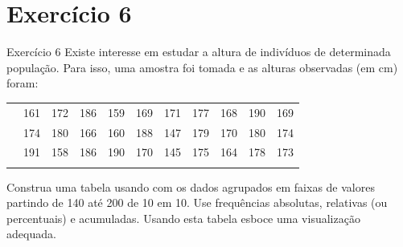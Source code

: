 \documentclass[
  ignorenonframetext,
  serif,
  professionalfont,
  usenames,
  dvipsnames,
  aspectratio = 169]{beamer}
\begin{document}
\section{Exercício 6}\label{exercuxedcio-6}

\begin{frame}{Exercício 6}
\label{exercuxedcio-6-1}
Existe interesse em estudar a altura de indivíduos de determinada
população. Para isso, uma amostra foi tomada e as alturas observadas (em
cm) foram:

\begin{longtable}[]{@{}lrrrrrrrrrr@{}}
\toprule\noalign{}
\endhead
& 161 & 172 & 186 & 159 & 169 & 171 & 177 & 168 & 190 & 169 \\
& 174 & 180 & 166 & 160 & 188 & 147 & 179 & 170 & 180 & 174 \\
& 191 & 158 & 186 & 190 & 170 & 145 & 175 & 164 & 178 & 173 \\
\bottomrule\noalign{}
\end{longtable}

Construa uma tabela usando com os dados agrupados em faixas de valores
partindo de 140 até 200 de 10 em 10. Use frequências absolutas,
relativas (ou percentuais) e acumuladas. Usando esta tabela esboce uma
visualização adequada.
\end{frame}
\end{document}
